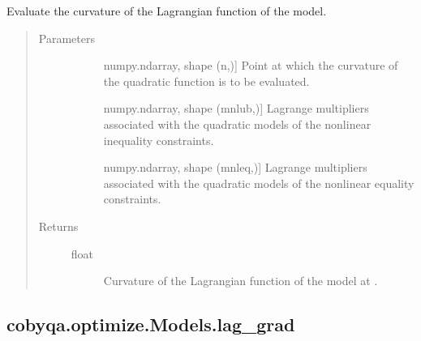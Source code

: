 \documentclass[letterpaper,10pt,english]{sphinxmanual}
\begin{document}
\begin{fulllineitems}
\begin{fulllineitems}
\label{\detokenize{refs/generated/cobyqa.optimize.Models.lag_curv:cobyqa.optimize.Models.lag_curv}}
\sphinxAtStartPar
Evaluate the curvature of the Lagrangian function of the model.
\begin{quote}\begin{description}
\item[{Parameters}] \leavevmode\begin{description}
\item[{}] \leavevmode{[}numpy.ndarray, shape (n,){]}
\sphinxAtStartPar
Point at which the curvature of the quadratic function is to be
evaluated.

\item[{}] \leavevmode{[}numpy.ndarray, shape (mnlub,){]}
\sphinxAtStartPar
Lagrange multipliers associated with the quadratic models of the
nonlinear inequality constraints.

\item[{}] \leavevmode{[}numpy.ndarray, shape (mnleq,){]}
\sphinxAtStartPar
Lagrange multipliers associated with the quadratic models of the
nonlinear equality constraints.

\end{description}

\item[{Returns}] \leavevmode\begin{description}
\item[{float}] \leavevmode
\sphinxAtStartPar
Curvature of the Lagrangian function of the model at .

\end{description}

\end{description}\end{quote}

\end{fulllineitems}



\subsection{cobyqa.optimize.Models.lag\_grad}
\label{\detokenize{refs/generated/cobyqa.optimize.Models.lag_grad:cobyqa-optimize-models-lag-grad}}\label{\detokenize{refs/generated/cobyqa.optimize.Models.lag_grad::doc}}


\end{fulllineitems}
\end{document}
